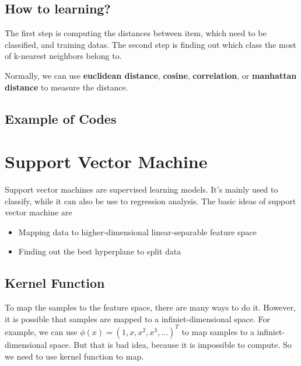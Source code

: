 \documentclass{article}
\begin{document}
\subsection{How to learning?}
\label{sec:knn:learning}

The first step is computing the distances between item, which need to be classified, and training datas.
The second step is finding out which class the most of k-nearest neighbors belong to.

Normally, we can use \textbf{euclidean distance}, \textbf{cosine}, \textbf{correlation},
or \textbf{manhattan distance} to measure the distance.

\subsection{Example of Codes}
\label{sec:knn:code}

\section{Support Vector Machine}
\label{sec:svm}

Support vector machines are supervised learning models\cite{svm-wikipedia}. It's mainly used to classify,
while it can also be use to regression analysis.
The basic ideas of support vector machine are
\begin{itemize}
\item Mapping data to higher-dimensional linear-separable feature space
\item Finding out the best hyperplane to split data
\end{itemize}

\subsection{Kernel Function}
\label{sec:svm:kf}

To map the samples to the feature space, there are many ways to do it.
However, it is possible that samples are mapped to a infiniet-dimensional space.
For example, we can use $\phi(x)=(1,x,x^2,x^3,\dots)^T$ to map samples to a infiniet-dimensional space.
But that is bad idea, because it is impossible to compute.
So we need to use kernel function to map.
\end{document}
